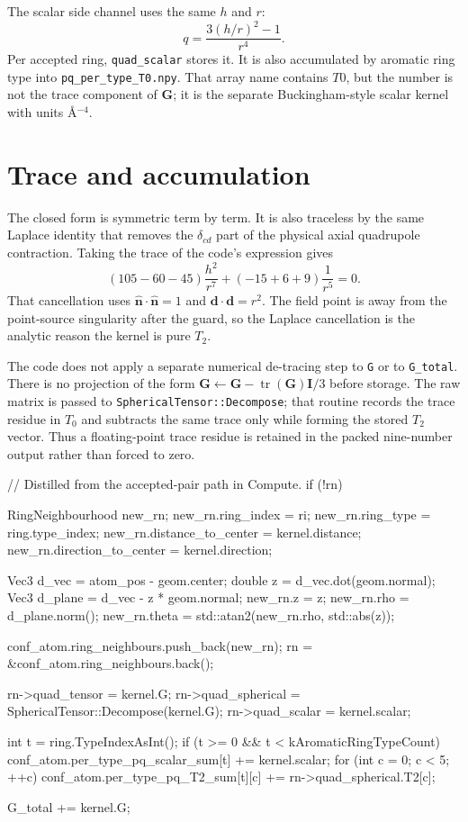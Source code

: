 \documentclass[11pt]{article}
\newcommand{\code}[1]{\texttt{#1}}
\begin{document}
The scalar side channel uses the same \(h\) and \(r\):
\[
  q = \frac{3(h/r)^2-1}{r^4}.
\]
Per accepted ring, \code{quad\_scalar} stores it. It is also accumulated by
aromatic ring type into \code{pq\_per\_type\_T0\allowbreak.npy}. That array
name contains \(T0\), but the number is not the trace component of \(\bm G\);
it is the separate Buckingham-style scalar kernel with units
\(\si{\angstrom^{-4}}\).

\section{Trace and accumulation}

The closed form is symmetric term by term. It is also traceless by the same
Laplace identity that removes the \(\delta_{cd}\) part of the physical axial
quadrupole contraction. Taking the trace of the code's expression gives
\[
  (105-60-45)\frac{h^2}{r^7}
  +(-15+6+9)\frac{1}{r^5}=0 .
\]
That cancellation uses \(\hat{\bm n}\cdot\hat{\bm n}=1\) and
\(\bm d\cdot\bm d=r^2\). The field point is away from the point-source
singularity after the guard, so the Laplace cancellation is the analytic
reason the kernel is pure \(T_2\).

The code does not apply a separate numerical de-tracing step to \code{G} or to
\code{G\_total}. There is no projection of the form
\(\bm G\leftarrow\bm G-\operatorname{tr}(\bm G)\bm I/3\) before storage. The
raw matrix is passed to \code{SphericalTensor::Decompose}; that routine records
the trace residue in \(T_0\) and subtracts the same trace only while forming
the stored \(T_2\) vector. Thus a floating-point trace residue is retained in
the packed nine-number output rather than forced to zero.

\begin{codebox}
// Distilled from the accepted-pair path in Compute.
if (!rn) {
    RingNeighbourhood new_rn;
    new_rn.ring_index = ri;
    new_rn.ring_type = ring.type_index;
    new_rn.distance_to_center = kernel.distance;
    new_rn.direction_to_center = kernel.direction;

    Vec3 d_vec = atom_pos - geom.center;
    double z = d_vec.dot(geom.normal);
    Vec3 d_plane = d_vec - z * geom.normal;
    new_rn.z = z;
    new_rn.rho = d_plane.norm();
    new_rn.theta = std::atan2(new_rn.rho, std::abs(z));

    conf_atom.ring_neighbours.push_back(new_rn);
    rn = &conf_atom.ring_neighbours.back();
}

rn->quad_tensor = kernel.G;
rn->quad_spherical = SphericalTensor::Decompose(kernel.G);
rn->quad_scalar = kernel.scalar;

int t = ring.TypeIndexAsInt();
if (t >= 0 && t < kAromaticRingTypeCount) {
    conf_atom.per_type_pq_scalar_sum[t] += kernel.scalar;
    for (int c = 0; c < 5; ++c)
        conf_atom.per_type_pq_T2_sum[t][c] += rn->quad_spherical.T2[c];
}

G_total += kernel.G;
\end{codebox}
\end{document}
